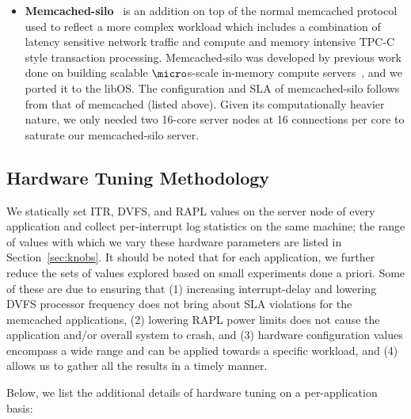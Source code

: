 \begin{itemize}
\item \textbf{Memcached-silo}~\cite{mcdsilo} is an addition on top of the
normal memcached protocol used to reflect a more complex workload which
includes a combination of latency sensitive network traffic and compute and
memory intensive TPC-C style transaction processing.
Memcached-silo was developed by previous work done on building
scalable $\micro$s-scale in-memory compute servers~\cite{zygos},  and we ported it to the libOS.
The configuration and SLA of memcached-silo follows from that of memcached
(listed above). Given its computationally heavier nature, we only needed two
16-core server nodes at 16 connections per core to saturate our memcached-silo
server.
\end{itemize}

\subsection{Hardware Tuning Methodology}
\label{sec:hw_tuning}
We statically set ITR, DVFS, and RAPL values on the server node of
every application and collect per-interrupt log statistics on the same machine;
the range of values with which we vary these hardware parameters are listed in
Section~\ref{sec:knobs}.
It should be noted that for each application, we further reduce the sets of
values explored based on small experiments done a priori. Some of these are due
to ensuring that (1) increasing interrupt-delay and lowering DVFS processor
frequency does not bring about SLA violations for the memcached applications,
(2) lowering RAPL power limits does not cause the application and/or overall
system to crash, and (3) hardware configuration values encompass a wide range
and can be applied towards a specific workload, and (4) allows us to gather all
the results in a timely manner.

Below, we list the additional details of hardware tuning on a per-application
basis:
     

